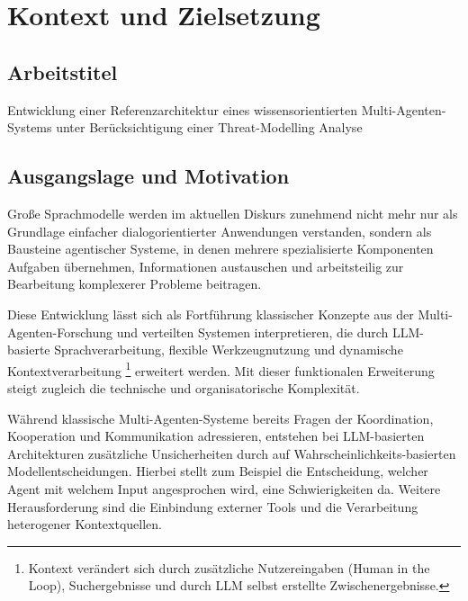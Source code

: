%

\section{Kontext und Zielsetzung}

\subsection{Arbeitstitel}

Entwicklung einer Referenzarchitektur eines wissensorientierten Multi-Agenten-Systems unter Berücksichtigung einer Threat-Modelling Analyse

\subsection{Ausgangslage und Motivation}

Große Sprachmodelle werden im aktuellen Diskurs zunehmend nicht mehr nur als Grundlage einfacher dialogorientierter Anwendungen verstanden, sondern als Bausteine agentischer Systeme, in denen mehrere spezialisierte Komponenten Aufgaben übernehmen, Informationen austauschen und arbeitsteilig zur Bearbeitung komplexerer Probleme beitragen. \cite{wooldridge_intelligent_1995,jennings_roadmap_1998,botti_agentic_2025}

Diese Entwicklung lässt sich als Fortführung klassischer Konzepte aus der Multi-Agenten-Forschung und verteilten Systemen interpretieren, die durch LLM-basierte Sprachverarbeitung, flexible Werkzeugnutzung und dynamische Kontextverarbeitung \footnote{Kontext verändert sich durch zusätzliche Nutzereingaben (Human in the Loop), Suchergebnisse und durch LLM selbst erstellte Zwischenergebnisse.} erweitert werden. \cite{jennings_roadmap_1998,yan_beyond_2025,wang_large_2026} Mit dieser funktionalen Erweiterung steigt zugleich die technische und organisatorische Komplexität. \cite{jennings_roadmap_1998,wong_adding_2000,ferrag_prompt_2026}

Während klassische Multi-Agenten-Systeme bereits Fragen der Koordination, Kooperation und Kommunikation adressieren, entstehen bei LLM-basierten Architekturen zusätzliche Unsicherheiten durch auf Wahrscheinlichkeits-basierten Modellentscheidungen. \cite{wong_adding_2000,ferrag_prompt_2026,raza_trism_2026} Hierbei stellt zum Beispiel die Entscheidung, welcher Agent mit welchem Input angesprochen wird, eine Schwierigkeiten da. Weitere Herausforderung sind die Einbindung externer Tools und die Verarbeitung heterogener Kontextquellen.


